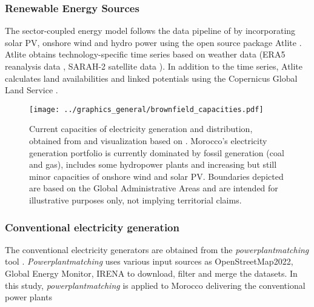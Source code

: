 \subsubsection*{Renewable Energy Sources}
The sector-coupled energy model follows the data pipeline of \cite{Parzen2023} by incorporating solar PV, onshore wind and hydro power using the open source package Atlite \cite{Hofmann2021}. %
Atlite obtains technology-specific time series based on weather data (ERA5 reanalysis data \cite{Hersbach2020}, SARAH-2 satellite data \cite{Pfeifroth2017}). %
In addition to the time series, Atlite calculates land availabilities and linked potentials using the Copernicus Global Land Service \cite{Buchhorn2020}.





\begin{figure*}[t]
    \centering
    \texttt{[image: ../graphics\_general/brownfield\_capacities.pdf]}
    \caption{Current capacities of electricity generation and distribution, obtained from \cite{Parzen2022} and visualization based on \cite{Horsch2018}. Morocco's electricity generation portfolio is currently dominated by fossil generation (coal and gas), includes some hydropower plants and increasing but still minor capacities of onshore wind and solar PV. Boundaries depicted are based on the Global Administrative Areas and are intended for illustrative purposes only, not implying territorial claims.
    }
    \label{fig:MAR_brownfield}
\end{figure*}


\subsubsection*{Conventional electricity generation}
The conventional electricity generators are obtained from the \textit{powerplantmatching} tool \cite{Powerplantmatching2019}. \textit{Powerplantmatching} uses various input sources as OpenStreetMap2022, Global Energy Monitor, IRENA \cite{IRENA2022, OpenStreetMap2022, GlobalEnergyMonitor} to download, filter and merge the datasets. 
In this study, \textit{powerplantmatching} is applied to Morocco delivering the conventional power plants%


